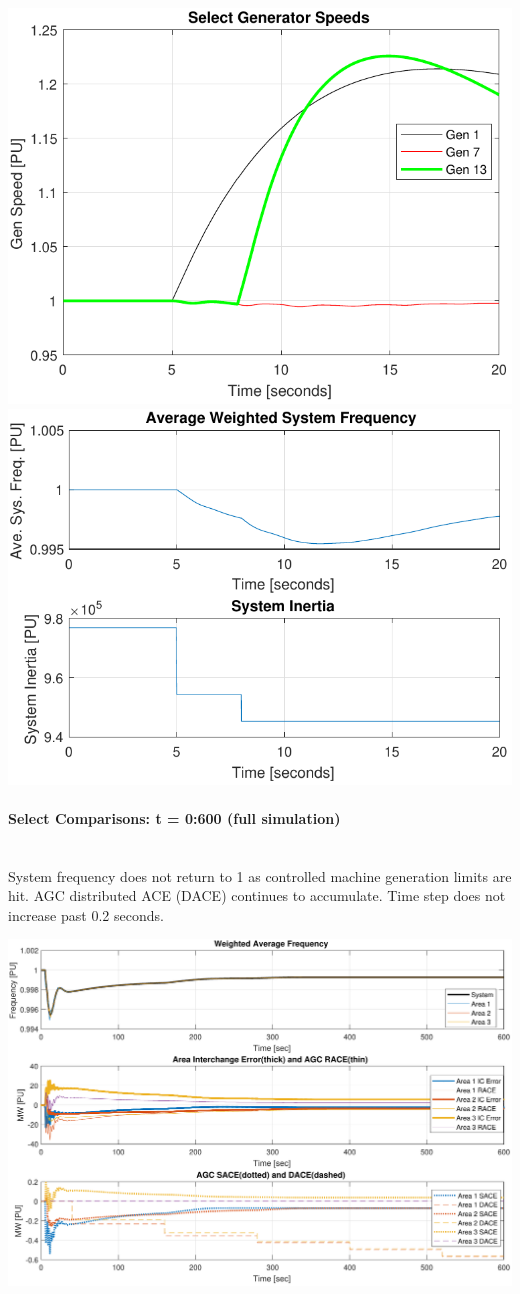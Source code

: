 \documentclass[12pt]{article}
\begin{document}
\begin{center}
\includegraphics[width=.45\linewidth]{genTripSPD01}%
\includegraphics[width=.45\linewidth]{genTripFnH01}%
\end{center}


\pagebreak
\paragraph{Select Comparisons: t = 0:600 (full simulation)} \ \\
System frequency does not return to 1 as controlled machine generation limits are hit.
AGC distributed ACE (DACE) continues to accumulate.
Time step does not increase past 0.2 seconds.

\includegraphics[width=\linewidth]{genTripAGC01}
\end{document}
